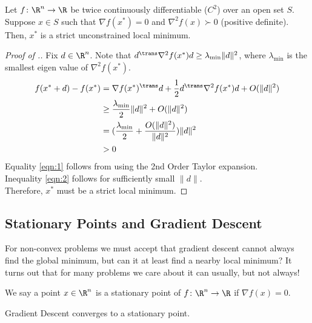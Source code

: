 \begin{proposition}
    Let $f\colon \R^n \to \R$ be twice continuously differentiable ($C^2$) over an open set $S$. Suppose $x \in S$ such that $\nabla f(x^*) = 0$ and $\nabla^2f(x) \succ 0$ (positive definite). Then, $x^*$ is a strict unconstrained local minimum.
\end{proposition}

\begin{proof}[Proof of .]
Fix $d \in \R^n$. Note that $d^\trans \nabla^2 f(x^*) d \ge \lambda_{\text{min}} \|d\|^2$, where $\lambda_\text{min}$ is the smallest eigen value of $\nabla^2 f(x^*)$.
\begin{align}
    f(x^* + d) - f(x^*) &= \nabla f(x^*)^\trans d + \frac{1}{2}d^\trans \nabla^2 f(x^*)d + O(\|d\|^2) \label{eqn:1}\\
    &\ge \frac{\lambda_{\text{min}}}{2} \|d\|^2 + O(\|d\|^2) \nonumber\\
    &= (\frac{\lambda_{\text{min}}}{2} + \frac{O(\|d\|^2)}{\|d\|^2}) \|d\|^2 \nonumber\\
    &> 0 \label{eqn:2}
\end{align}
Equality \ref{eqn:1} follows from using the 2nd Order Taylor expansion.\\
Inequality \ref{eqn:2} follows for sufficiently small $\|d\|$.\\ 
\newline
Therefore, $x^*$ must be a strict local minimum.
\end{proof}

\subsection{Stationary Points and Gradient Descent}

For non-convex problems we must accept that gradient descent cannot always find the global minimum, but can it at least find a nearby local minimum? It turns out that for many problems we care about it can usually, but not always!

\begin{definition}
We say a point $x \in \R^n$ is a stationary point of $f\colon \R^n \to \R$ if $\nabla f(x) = 0$.
\end{definition}

\begin{proposition}
Gradient Descent converges to a stationary point.
\end{proposition}

